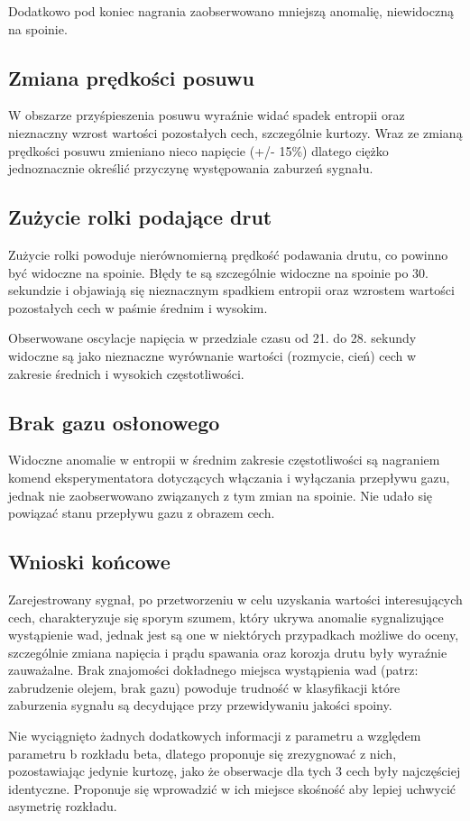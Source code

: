 \documentclass{mwart}
\begin{document}
	Dodatkowo pod koniec nagrania zaobserwowano mniejszą anomalię, niewidoczną na spoinie.
	
	
	\subsection{Zmiana prędkości posuwu}
	W obszarze przyśpieszenia posuwu wyraźnie widać spadek entropii oraz nieznaczny wzrost wartości pozostałych cech, szczególnie kurtozy. Wraz ze zmianą prędkości posuwu zmieniano nieco napięcie (+/- 15\%) dlatego ciężko jednoznacznie określić przyczynę występowania zaburzeń sygnału.
	

	\subsection{Zużycie rolki podające drut}
	Zużycie rolki powoduje nierównomierną prędkość podawania drutu, co powinno być widoczne na spoinie. Błędy te są szczególnie widoczne na spoinie po 30. sekundzie i objawiają się nieznacznym spadkiem entropii oraz wzrostem wartości pozostałych cech w paśmie średnim i wysokim. 
	
	Obserwowane oscylacje napięcia w przedziale czasu od 21. do 28. sekundy widoczne są jako nieznaczne wyrównanie wartości (rozmycie, cień) cech w zakresie średnich i wysokich częstotliwości.
	
	
	\subsection{Brak gazu osłonowego}
	Widoczne anomalie w entropii  w średnim zakresie częstotliwości są nagraniem komend eksperymentatora dotyczących włączania i wyłączania przepływu gazu, jednak nie zaobserwowano związanych z tym zmian na spoinie. Nie udało się powiązać stanu przepływu gazu z obrazem cech.
	
	
	\subsection{Wnioski końcowe}
	Zarejestrowany sygnał, po przetworzeniu w celu uzyskania wartości interesujących cech, charakteryzuje się sporym szumem, który ukrywa anomalie sygnalizujące wystąpienie wad, jednak jest są one w niektórych przypadkach możliwe do oceny, szczególnie zmiana napięcia i prądu spawania oraz korozja drutu były wyraźnie zauważalne. Brak znajomości dokładnego miejsca wystąpienia wad (patrz: zabrudzenie olejem, brak gazu) powoduje trudność w klasyfikacji które zaburzenia sygnału są decydujące przy przewidywaniu jakości spoiny.
	
	Nie wyciągnięto żadnych dodatkowych informacji z parametru a względem parametru b rozkładu beta, dlatego proponuje się zrezygnować z nich, pozostawiając jedynie kurtozę, jako że obserwacje dla tych 3 cech były najczęściej identyczne. Proponuje się wprowadzić w ich miejsce skośność aby lepiej uchwycić asymetrię rozkładu.
	


 

\end{document}
